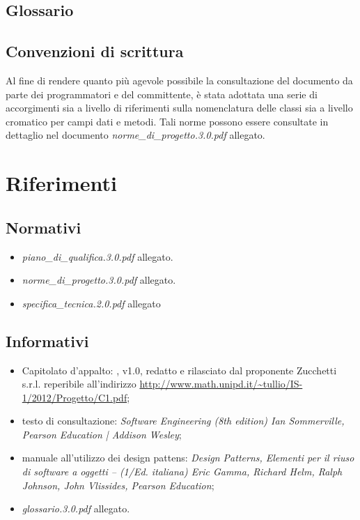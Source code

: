 \subsection{Glossario}
\glossaryIntro

\subsection{Convenzioni di scrittura}
Al fine di rendere quanto più agevole possibile la consultazione del documento da parte dei programmatori e del committente, è stata adottata una serie di accorgimenti sia a livello di riferimenti sulla nomenclatura delle classi sia a livello cromatico per campi dati e metodi. 
Tali norme possono essere consultate in dettaglio nel documento \textit{norme\_di\_progetto.3.0.pdf} allegato.
\clearpage

\section{Riferimenti}
\subsection{Normativi}
\begin{itemize}
\item[] \textit{piano\_di\_qualifica.3.0.pdf} allegato.
\item[] \textit{norme\_di\_progetto.3.0.pdf} allegato.
\item[] \textit{specifica\_tecnica.2.0.pdf} allegato
\end{itemize}

\subsection{Informativi}
\begin{itemize}
\item[] Capitolato d'appalto: \caName{}, v1.0, redatto e rilasciato dal proponente Zucchetti s.r.l. reperibile all'indirizzo \url{http://www.math.unipd.it/~tullio/IS-1/2012/Progetto/C1.pdf};
\item[] testo di consultazione: \textit{Software Engineering (8th edition) Ian Sommerville, Pearson Education | Addison Wesley};
\item[] manuale all'utilizzo dei design pattens: \textit{Design Patterns, Elementi per il riuso di software a oggetti -- (1/Ed. italiana) Eric Gamma, Richard Helm, Ralph Johnson, John Vlissides, Pearson Education};
\item[] \textit{glossario.3.0.pdf} allegato.
\end{itemize}
\clearpage

